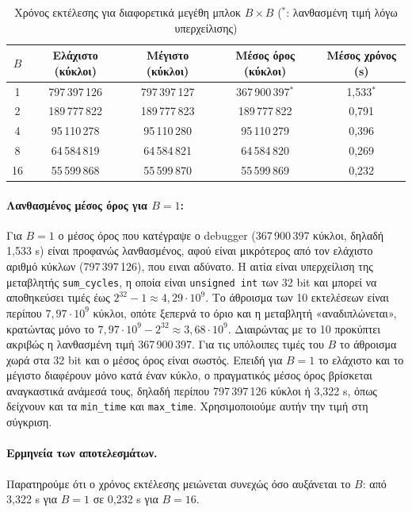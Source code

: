 \documentclass[12pt]{article}
\begin{document}
\begin{table}[H]
    \centering
    \begin{tabular}{ccccc}
        \toprule
        $B$ & Ελάχιστο (κύκλοι) & Μέγιστο (κύκλοι) & Μέσος όρος (κύκλοι) & Μέσος χρόνος (s) \\
        \midrule
        1 & 797\,397\,126 & 797\,397\,127 & 367\,900\,397$^{*}$ & 1,533$^{*}$ \\
        2 & 189\,777\,822 & 189\,777\,823 & 189\,777\,822 & 0,791 \\
        4 & 95\,110\,278 & 95\,110\,280 & 95\,110\,279 & 0,396 \\
        8 & 64\,584\,819 & 64\,584\,821 & 64\,584\,820 & 0,269 \\
        16 & 55\,599\,868 & 55\,599\,870 & 55\,599\,869 & 0,232 \\
        \bottomrule
    \end{tabular}
    \caption{Χρόνος εκτέλεσης για διαφορετικά μεγέθη μπλοκ $B \times B$ ($^{*}$: λανθασμένη τιμή λόγω υπερχείλισης)}
    \label{tab:block-size}
\end{table}

\paragraph{Λανθασμένος μέσος όρος για $B = 1$:}
Για $B = 1$ ο μέσος όρος που κατέγραψε ο debugger (367\,900\,397 κύκλοι, δηλαδή 1,533 s) είναι προφανώς λανθασμένος, αφού είναι μικρότερος από τον ελάχιστο αριθμό κύκλων (797\,397\,126), που ειναι αδύνατο. Η αιτία είναι υπερχείλιση της μεταβλητής \texttt{sum\_cycles}, η οποία είναι \texttt{unsigned int} των 32 bit και μπορεί να αποθηκεύσει τιμές έως $2^{32} - 1 \approx 4{,}29 \cdot 10^9$. Το άθροισμα των 10 εκτελέσεων είναι περίπου $7{,}97 \cdot 10^9$ κύκλοι, οπότε ξεπερνά το όριο και η μεταβλητή «αναδιπλώνεται», κρατώντας μόνο το $7{,}97 \cdot 10^9 - 2^{32} \approx 3{,}68 \cdot 10^9$. Διαιρώντας με το 10 προκύπτει ακριβώς η λανθασμένη τιμή 367\,900\,397. Για τις υπόλοιπες τιμές του $B$ το άθροισμα χωρά στα 32 bit και ο μέσος όρος είναι σωστός. Επειδή για $B = 1$ το ελάχιστο και το μέγιστο διαφέρουν μόνο κατά έναν κύκλο, ο πραγματικός μέσος όρος βρίσκεται αναγκαστικά ανάμεσά τους, δηλαδή περίπου 797\,397\,126 κύκλοι ή 3,322 s, όπως δείχνουν και τα \texttt{min\_time} και \texttt{max\_time}. Χρησιμοποιούμε αυτήν την τιμή στη σύγκριση.

\paragraph{Ερμηνεία των αποτελεσμάτων.}
Παρατηρούμε ότι ο χρόνος εκτέλεσης μειώνεται συνεχώς όσο αυξάνεται το $B$: από 3,322 s για $B = 1$ σε 0,232 s για $B = 16$.
\end{document}
